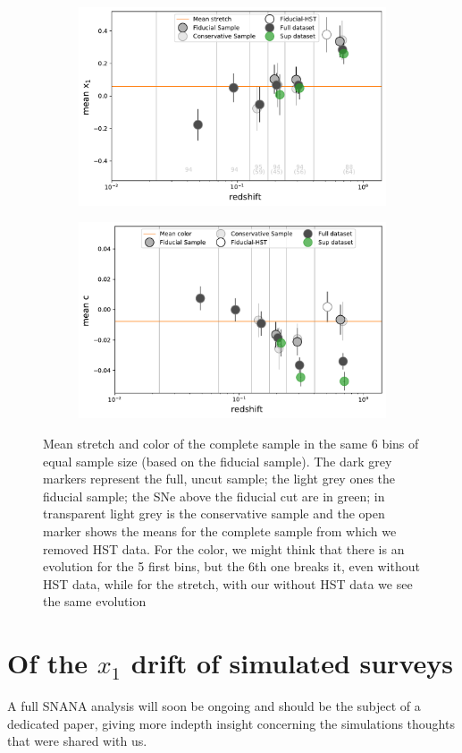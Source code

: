 \documentclass[11pt,a4paper]{paper}
\begin{document}
\begin{figure}[htbp!]
    \centering
    \begin{subfigure}[t]{0.49\linewidth}
        \centering
        \includegraphics[width=\linewidth]{Answer_figures/mean_stretchs-nHST_full-sup.pdf}
    \end{subfigure}
    \begin{subfigure}[t]{0.49\linewidth}
        \centering
        \includegraphics[width=\linewidth]{Answer_figures/mean_colors-nHST_full-sup.pdf}
    \end{subfigure}
    \centering
    \captionsetup{justification=centering, size=small}
    \caption{Mean stretch and color of the complete sample in the same 6 bins of
        equal sample size (based on the fiducial sample). The dark grey markers
        represent the full, uncut sample; the light grey ones the fiducial
        sample; the SNe above the fiducial cut are in green; in transparent
        light grey is the conservative sample and the open marker shows the
        means for the complete sample from which we removed HST data. For the
        color, we might think that there is an evolution for the 5 first bins,
        but the 6th one breaks it, even without HST data, while for the stretch,
    with our without HST data we see the same evolution}
    \label{fig:means}
\end{figure}

\section{Of the $x_1$ drift of simulated surveys}
A full SNANA analysis will soon be ongoing and should be the subject of a
dedicated paper, giving more indepth insight concerning the simulations
thoughts that were shared with us.
\end{document}
